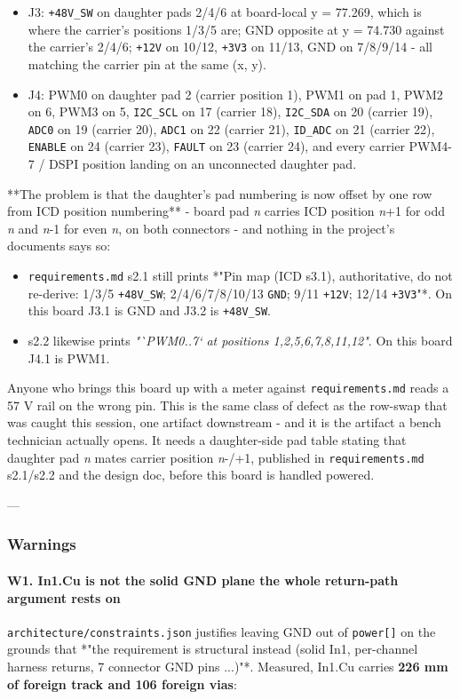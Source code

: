 \documentclass[11pt,a4paper]{article}
\begin{document}
\begin{itemize}
\item J3: \texttt{+48V\_SW} on daughter pads 2/4/6 at board-local y = 77.269, which is
where the carrier's positions 1/3/5 are; GND opposite at y = 74.730 against
the carrier's 2/4/6; \texttt{+12V} on 10/12, \texttt{+3V3} on 11/13, GND on 7/8/9/14 -
all matching the carrier pin at the same (x, y).
\item J4: PWM0 on daughter pad 2 (carrier position 1), PWM1 on pad 1, PWM2 on 6,
PWM3 on 5, \texttt{I2C\_SCL} on 17 (carrier 18), \texttt{I2C\_SDA} on 20 (carrier 19),
\texttt{ADC0} on 19 (carrier 20), \texttt{ADC1} on 22 (carrier 21), \texttt{ID\_ADC} on 21
(carrier 22), \texttt{ENABLE} on 24 (carrier 23), \texttt{FAULT} on 23 (carrier 24), and
every carrier PWM4-7 / DSPI position landing on an unconnected daughter pad.
\end{itemize}
{*}{*}The problem is that the daughter's pad numbering is now offset by one row from ICD position numbering{*}{*} - board pad \emph{n} carries ICD position \emph{n}+1 for odd \emph{n} and \emph{n}-1 for even \emph{n}, on both connectors - and nothing in the project's documents says so:

\begin{itemize}
\item \texttt{requirements.md} s2.1 still prints {*}"Pin map (ICD s3.1), authoritative, do
not re-derive: 1/3/5 \texttt{+48V\_SW}; 2/4/6/7/8/10/13 \texttt{GND}; 9/11 \texttt{+12V}; 12/14
\texttt{+3V3}"{*}. On this board J3.1 is GND and J3.2 is \texttt{+48V\_SW}.
\item s2.2 likewise prints \emph{"`PWM0..7` at positions 1,2,5,6,7,8,11,12"}. On this
board J4.1 is PWM1.
\end{itemize}
Anyone who brings this board up with a meter against \texttt{requirements.md} reads a 57 V rail on the wrong pin. This is the same class of defect as the row-swap that was caught this session, one artifact downstream - and it is the artifact a bench technician actually opens. It needs a daughter-side pad table stating that daughter pad \emph{n} mates carrier position \emph{n}-/+1, published in \texttt{requirements.md} s2.1/s2.2 and the design doc, before this board is handled powered.

---

\subsubsection*{Warnings}
\paragraph*{W1. In1.Cu is not the solid GND plane the whole return-path argument rests on}
\texttt{architecture/constraints.json} justifies leaving GND out of \texttt{power{[}{]}} on the grounds that {*}"the requirement is structural instead (solid In1, per-channel harness returns, 7 connector GND pins ...)"{*}. Measured, In1.Cu carries \textbf{226 mm of foreign track and 106 foreign vias}:
\end{document}
